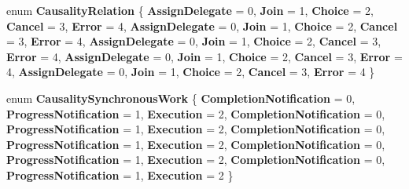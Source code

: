 \begin{DoxyCompactItemize}
\mbox{\label{namespace_windows_1_1_foundation_1_1_diagnostics_a45d3c9f2fddbec91a3035d3e79a246c8}} 
enum {\bfseries Causality\+Relation} \{ \newline
{\bfseries Assign\+Delegate} = 0, 
{\bfseries Join} = 1, 
{\bfseries Choice} = 2, 
{\bfseries Cancel} = 3, 
\newline
{\bfseries Error} = 4, 
{\bfseries Assign\+Delegate} = 0, 
{\bfseries Join} = 1, 
{\bfseries Choice} = 2, 
\newline
{\bfseries Cancel} = 3, 
{\bfseries Error} = 4, 
{\bfseries Assign\+Delegate} = 0, 
{\bfseries Join} = 1, 
\newline
{\bfseries Choice} = 2, 
{\bfseries Cancel} = 3, 
{\bfseries Error} = 4, 
{\bfseries Assign\+Delegate} = 0, 
\newline
{\bfseries Join} = 1, 
{\bfseries Choice} = 2, 
{\bfseries Cancel} = 3, 
{\bfseries Error} = 4, 
\newline
{\bfseries Assign\+Delegate} = 0, 
{\bfseries Join} = 1, 
{\bfseries Choice} = 2, 
{\bfseries Cancel} = 3, 
\newline
{\bfseries Error} = 4
 \}
\item 
\mbox{\label{namespace_windows_1_1_foundation_1_1_diagnostics_a63986dc9acde6ceb9a128207a5bd1e56}} 
enum {\bfseries Causality\+Synchronous\+Work} \{ \newline
{\bfseries Completion\+Notification} = 0, 
{\bfseries Progress\+Notification} = 1, 
{\bfseries Execution} = 2, 
{\bfseries Completion\+Notification} = 0, 
\newline
{\bfseries Progress\+Notification} = 1, 
{\bfseries Execution} = 2, 
{\bfseries Completion\+Notification} = 0, 
{\bfseries Progress\+Notification} = 1, 
\newline
{\bfseries Execution} = 2, 
{\bfseries Completion\+Notification} = 0, 
{\bfseries Progress\+Notification} = 1, 
{\bfseries Execution} = 2, 
\newline
{\bfseries Completion\+Notification} = 0, 
{\bfseries Progress\+Notification} = 1, 
{\bfseries Execution} = 2
 \}
\end{DoxyCompactItemize}

